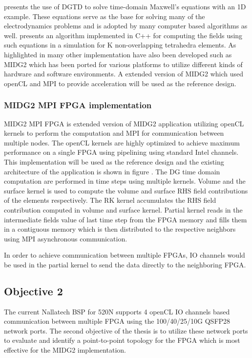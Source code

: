\documentclass[english,notitlepage]{hgbreport}
\begin{document}
\textcite{Hesthaven_190449} presents the use of DGTD to solve time-domain Maxwell's equations with an 1D example.
These equations serve as the base for solving many of the electrodynamics problems and is adopted by
many computer based algorithms as well. \cite{} presents an algorithm implemented in C++ for computing
the fields using such equations in a simulation for K non-overlapping tetrahedra elements. As highlighted 
in \cite{} many other implementation have also been developed such as MIDG2
which has been ported for various platforms to utilize different kinds of hardware and software environments.
A extended version of MIDG2 which used openCL and MPI to provide acceleration will be used as the reference design.

\subsubsection{MIDG2 MPI FPGA implementation}
MIDG2 MPI FPGA is extended version of MIDG2 application utilizing openCL kernels to perform the
computation and MPI for communication between multiple nodes. The openCL kernels are
highly optimized to achieve maximum performance on a single FPGA using pipelining using
standard Intel channels. This implementation will be used as the reference design and
the existing architecture of the application is shown in figure .
The DG time domain computation are performed in time steps using multiple kernels.
Volume and the surface kernel is used to compute the volume and surface RHS field
contributions of the elements respectively. The RK kernel accumulates the RHS
field contribution computed in volume and surface kernel. Partial kernel reads in
the intermediate fields value of last time step from the FPGA memory and fills them
in a contiguous memory which is then distributed to the respective neighbors using
MPI asynchronous communication.

In order to achieve communication between multiple FPGAs, IO channels would be used
in the partial kernel to send the data directly to the neighboring FPGA.

\subsection{Objective 2}

The current Nallatech BSP for 520N supports 4 openCL IO channels based communication between
multiple FPGA using the 100/40/25/10G QSFP28 network ports. The second objective of
the thesis is to utilize these network ports to evaluate and identify a point-to-point
topology for the FPGA which is most effective for the MIDG2 implementation.
\end{document}
